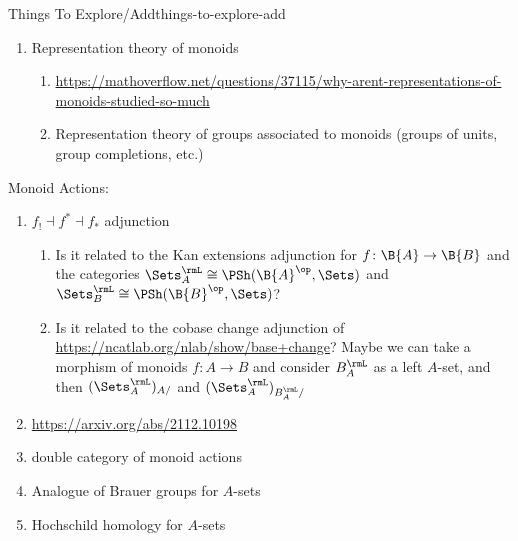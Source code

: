 \begin{remark}{Things To Explore/Add}{things-to-explore-add}
\begin{enumerate}
\begin{enumerate}
\begin{itemize}
\begin{align*}
                                x_{1}a_{2}    = x_{2}a_{3},\\
                                a_{2m-1}y_{m} = a_{2m}
                            \end{align*}
                            such that, for each $1\leq i\leq m$, we have $a_{i}\in\Im(f)$.
                    \end{itemize}
            \end{enumerate}
            Wikipedia says in \url{https://en.wikipedia.org/wiki/Isbell\%27s\_zigzag\_theorem}:
            \begin{quote}
                For monoids, this theorem can be written more concisely:
            \end{quote}
        \item Representation theory of monoids
            \begin{enumerate}
                \item \url{https://mathoverflow.net/questions/37115/why-arent-representations-of-monoids-studied-so-much}
                \item Representation theory of groups associated to monoids (groups of units, group completions, etc.)
            \end{enumerate}
    \end{enumerate}
    Monoid Actions:
    \begin{enumerate}
        \item $f_{!}\dashv f^{*}\dashv f_{*}$ adjunction
            \begin{enumerate}
                \item Is it related to the Kan extensions adjunction for $f\colon\B{A}\to\B{B}$ and the categories $\Sets^{\rmL}_{A}\cong\PSh(\B{A}^{\op},\Sets)$ and $\Sets^{\rmL}_{B}\cong\PSh(\B{B}^{\op},\Sets)$?
                \item Is it related to the cobase change adjunction of \url{https://ncatlab.org/nlab/show/base+change}? Maybe we can take a morphism of monoids $f\colon A\to B$ and consider $B^{\rmL}_{A}$ as a left $A$-set, and then $(\Sets^{\rmL}_{A})_{A/}$ and $(\Sets^{\rmL}_{A})_{B^{\rmL}_{A}/}$
            \end{enumerate}
        \item \url{https://arxiv.org/abs/2112.10198}
        \item double category of monoid actions
        \item Analogue of Brauer groups for $A$-sets
        \item Hochschild homology for $A$-sets

\end{enumerate}
\end{remark}
